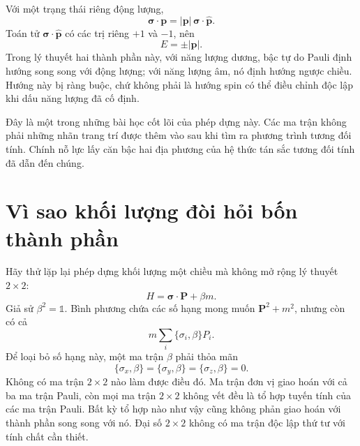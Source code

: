 Với một trạng thái riêng động lượng,
\begin{equation}
\boldsymbol{\sigma}\cdot\mathbf p
=
|\mathbf p|\,\boldsymbol{\sigma}\cdot\widehat{\mathbf p}.
\end{equation}
Toán tử \(\boldsymbol{\sigma}\cdot\widehat{\mathbf p}\) có các trị riêng \(+1\) và \(-1\), nên
\begin{equation}
E=\pm|\mathbf p|.
\end{equation}
Trong lý thuyết hai thành phần này, với năng lượng dương, bậc tự do Pauli định hướng song song với động lượng; với năng lượng âm, nó định hướng ngược chiều. Hướng này bị ràng buộc, chứ không phải là hướng spin có thể điều chỉnh độc lập khi dấu năng lượng đã cố định.

\begin{classroomqa}
\end{classroomqa}

Đây là một trong những bài học cốt lõi của phép dựng này. Các ma trận không phải những nhãn trang trí được thêm vào sau khi tìm ra phương trình tương đối tính. Chính nỗ lực lấy căn bậc hai địa phương của hệ thức tán sắc tương đối tính đã dẫn đến chúng.

\section{Vì sao khối lượng đòi hỏi bốn thành phần}

Hãy thử lặp lại phép dựng khối lượng một chiều mà không mở rộng lý thuyết \(2\times2\):
\begin{equation}
H=\boldsymbol{\sigma}\cdot\mathbf P+\beta m.
\label{eq:l10-failed-mass}
\end{equation}
Giả sử \(\beta^2=\mathbb{1}\). Bình phương chứa các số hạng mong muốn \(\mathbf P^2+m^2\), nhưng còn có cả
\begin{equation}
m\sum_i\{\sigma_i,\beta\}P_i.
\end{equation}
Để loại bỏ số hạng này, một ma trận \(\beta\) phải thỏa mãn
\begin{equation}
\{\sigma_x,\beta\}
=
\{\sigma_y,\beta\}
=
\{\sigma_z,\beta\}
=0.
\label{eq:l10-impossible-beta}
\end{equation}
Không có ma trận \(2\times2\) nào làm được điều đó. Ma trận đơn vị giao hoán với cả ba ma trận Pauli, còn mọi ma trận \(2\times2\) không vết đều là tổ hợp tuyến tính của các ma trận Pauli. Bất kỳ tổ hợp nào như vậy cũng không phản giao hoán với thành phần song song với nó. Đại số \(2\times2\) không có ma trận độc lập thứ tư với tính chất cần thiết.

